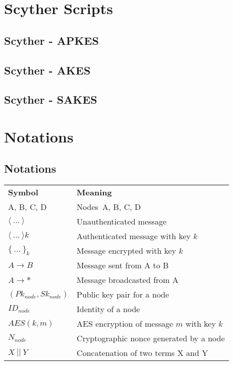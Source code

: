 \chapter{Scyther Scripts}
\label{app:listings}


\section{Scyther - APKES}
\label{app:apkes}



\section{Scyther - AKES}
\label{app:akes}



\section{Scyther - SAKES}
\label{app:sakes}



\chapter{Notations}

\section{Notations}
\label{app:notations}

\begin{tcolorbox}[title=Notations used in protocol specifications]
\begin{tabular}{ll}
\multicolumn{1}{p{1.3cm}}{\textbf{Symbol}} & \multicolumn{1}{p{4cm}}{\textbf{Meaning}}\\
A, B, C, D & Nodes\ A, B, C, D\\
$\langle{\ ...\ }\rangle{}$ & Unauthenticated message\\
$\langle{\ ...\ }\rangle{k}$ & Authenticated message with key $k$\\
$\{\ ...\ \}_k$ & Message encrypted with key $k$\\
$A \rightarrow B$ & Message sent from A to B\\
$A \rightarrow *$ & Message broadcasted from A\\
$(Pk_{node}, Sk_{node})$ & Public key pair for a node \\
$ID_{node}$ & Identity of a node\\
$AES(k, m)$ & AES encryption of message $m$ with key $k$\\
$N_{node}$ & Cryptographic nonce generated by a node\\
$X\ ||\ Y$ & Concatenation of two terms X and Y\\ 
\end{tabular}
\end{tcolorbox}


